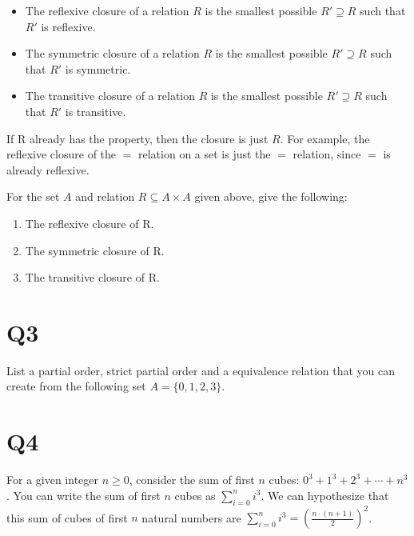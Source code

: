 \documentclass[12pt]{exam}
\begin{document}
\begin{itemize}
    \item The reflexive closure of a relation $R$ is the smallest possible $R' \supseteq R$ such that $R'$ is reflexive.
    \item The symmetric closure of a relation $R$ is the smallest possible $R' \supseteq R$ such that $R'$ is symmetric.
    \item The transitive closure of a relation $R$ is the smallest possible $R' \supseteq R$ such that $R'$ is transitive.
\end{itemize}

If R already has the property, then the closure is just $R$. For example, the reflexive closure of the $=$ relation on a set is just the $=$ relation, since $=$ is already reflexive.

For the set $A$ and relation $R \subseteq A \times A$ given above, give the following:

\begin{enumerate}
    \item The reflexive closure of R.
    \item The symmetric closure of R.
    \item The transitive closure of R.
\end{enumerate}

\section{Q3}
List a partial order, strict partial order and a equivalence relation that you can create from the following set $A=\{0,1,2,3\}$.


\section{Q4} 
For a given integer $n \geq 0$, consider the sum of first $n$ cubes: $0^3 + 1^3 + 2^3 + \cdots + n^3$. You can write the sum of first $n$ cubes as $\sum_{i=0}^{n}i^3$. We can hypothesize that this sum of cubes of first $n$ natural numbers are $\sum_{i=0}^{n}i^3 = (\frac{n\cdot(n+1)}{2})^2$. 
\end{document}
